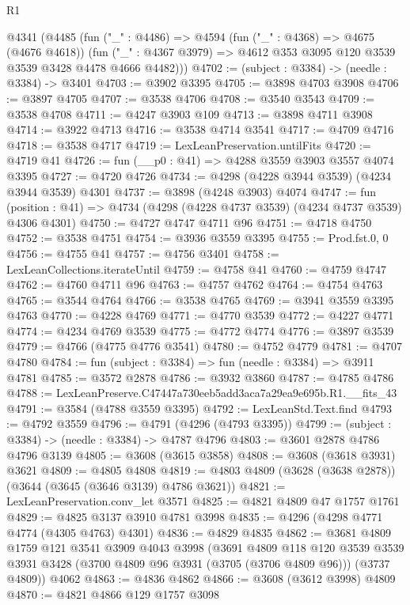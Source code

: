 \begin{lexlean}{R1}
\begin{coremodule}
  @4341
    (@4485
      (fun ("_" : @4486) =>
      @4594
        (fun ("_" : @4368) => @4675 (@4676 @4618))
        (fun ("_" : @4367 @3979) => @4612 @353 @3095 @120 @3539 @3539 @3428 @4478 @4666 @4482)))
@4702 := (subject : @3384) -> (needle : @3384) -> @3401
@4703 := @3902 @3395
@4705 := @3898 @4703 @3908
@4706 := @3897 @4705
@4707 := @3538 @4706
@4708 := @3540 @3543
@4709 := @3538 @4708
@4711 := @4247 @3903 @109
@4713 := @3898 @4711 @3908
@4714 := @3922 @4713
@4716 := @3538 @4714 @3541
@4717 := @4709 @4716
@4718 := @3538 @4717
@4719 := LexLeanPreservation.untilFits
@4720 := @4719 @41
@4726 := fun (__p0 : @41) => @4288 @3559 @3903 @3557 @4074 @3395
@4727 := @4720 @4726
@4734 := @4298 (@4228 @3944 @3539) (@4234 @3944 @3539) @4301
@4737 := @3898 (@4248 @3903) @4074
@4747 := fun (position : @41) => @4734 (@4298 (@4228 @4737 @3539) (@4234 @4737 @3539) @4306 @4301)
@4750 := @4727 @4747 @4711 @96
@4751 := @4718 @4750
@4752 := @3538 @4751
@4754 := @3936 @3559 @3395
@4755 := Prod.fst.{0, 0}
@4756 := @4755 @41
@4757 := @4756 @3401
@4758 := LexLeanCollections.iterateUntil
@4759 := @4758 @41
@4760 := @4759 @4747
@4762 := @4760 @4711 @96
@4763 := @4757 @4762
@4764 := @4754 @4763
@4765 := @3544 @4764
@4766 := @3538 @4765
@4769 := @3941 @3559 @3395 @4763
@4770 := @4228 @4769
@4771 := @4770 @3539
@4772 := @4227 @4771
@4774 := @4234 @4769 @3539
@4775 := @4772 @4774
@4776 := @3897 @3539
@4779 := @4766 (@4775 @4776 @3541)
@4780 := @4752 @4779
@4781 := @4707 @4780
@4784 := fun (subject : @3384) => fun (needle : @3384) => @3911 @4781
@4785 := @3572 @2878
@4786 := @3932 @3860
@4787 := @4785 @4786
@4788 := LexLeanPreserve.C47447a730eeb5add3aca7a29ea9e695b.R1.__fits_43
@4791 := @3584 (@4788 @3559 @3395)
@4792 := LexLeanStd.Text.find
@4793 := @4792 @3559
@4796 := @4791 (@4296 (@4793 @3395))
@4799 := (subject : @3384) -> (needle : @3384) -> @4787 @4796
@4803 := @3601 @2878 @4786 @4796 @3139
@4805 := @3608 (@3615 @3858)
@4808 := @3608 (@3618 @3931) @3621
@4809 := @4805 @4808
@4819 := @4803 @4809 (@3628 (@3638 @2878)) (@3644 (@3645 (@3646 @3139) @4786 @3621))
@4821 := LexLeanPreservation.conv_let @3571
@4825 := @4821 @4809 @47 @1757 @1761
@4829 := @4825 @3137 @3910 @4781 @3998
@4835 := @4296 (@4298 @4771 @4774 (@4305 @4763) @4301)
@4836 := @4829 @4835
@4862 := @3681
    @4809
    @1759
    @121
    @3541
    @3909
    @4043
    @3998
    (@3691
      @4809
      @118
      @120
      @3539
      @3539
      @3931
      @3428
      (@3700 @4809 @96 @3931 (@3705 (@3706 @4809 @96)))
      (@3737 @4809))
    @4062
@4863 := @4836 @4862
@4866 := @3608 (@3612 @3998) @4809
@4870 := @4821 @4866 @129 @1757 @3098

\end{coremodule}
\end{lexlean}
